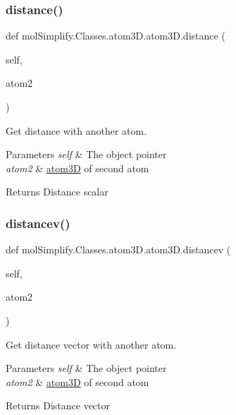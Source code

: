 \subsubsection{\texorpdfstring{distance()}{distance()}}
{\footnotesize\ttfamily def mol\+Simplify.\+Classes.\+atom3\+D.\+atom3\+D.\+distance (\begin{DoxyParamCaption}\item[{}]{self,  }\item[{}]{atom2 }\end{DoxyParamCaption})}



Get distance with another atom. 


\begin{DoxyParams}{Parameters}
{\em self} & The object pointer \\
\hline
{\em atom2} & \hyperlink{classmolSimplify_1_1Classes_1_1atom3D_1_1atom3D}{atom3D} of second atom \\
\hline
\end{DoxyParams}
\begin{DoxyReturn}{Returns}
Distance scalar 
\end{DoxyReturn}
\mbox{\label{classmolSimplify_1_1Classes_1_1atom3D_1_1atom3D_a32e06fac98f2835db82a3a265495481f}} 
\subsubsection{\texorpdfstring{distancev()}{distancev()}}
{\footnotesize\ttfamily def mol\+Simplify.\+Classes.\+atom3\+D.\+atom3\+D.\+distancev (\begin{DoxyParamCaption}\item[{}]{self,  }\item[{}]{atom2 }\end{DoxyParamCaption})}



Get distance vector with another atom. 


\begin{DoxyParams}{Parameters}
{\em self} & The object pointer \\
\hline
{\em atom2} & \hyperlink{classmolSimplify_1_1Classes_1_1atom3D_1_1atom3D}{atom3D} of second atom \\
\hline
\end{DoxyParams}
\begin{DoxyReturn}{Returns}
Distance vector 
\end{DoxyReturn}
\mbox{\label{classmolSimplify_1_1Classes_1_1atom3D_1_1atom3D_a5e99710890819b9533a7701d64f1512c}} 
